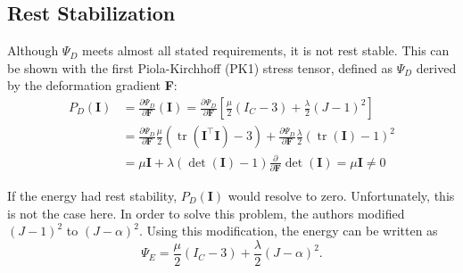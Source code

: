 
\subsection{Rest Stabilization}
Although $\Psi_{D}$ meets almost all stated requirements, it is not rest stable. This can be shown with the first Piola-Kirchhoff (PK1) stress tensor, defined as $\Psi_D$ derived by the deformation gradient \textbf{F}:
\begin{align*}
P_{D}(\mathbf{I}) &= \frac{\partial \Psi_{D}}{\partial \mathbf{F}} (\mathbf{I}) = \frac{\partial \Psi_{D}}{\partial \mathbf{F}} \left[ \frac{\mu}{2}\left(I_{C}-3\right) +\frac{\lambda}{2}(J-1)^{2} \right] \\
&= \frac{\partial \Psi_{D}}{\partial \mathbf{F}}  \frac{\mu}{2}\left(\operatorname{tr}(\mathbf{I}^\intercal \mathbf{I})-3\right) +\frac{\partial \Psi_{D}}{\partial \mathbf{F}} \frac{\lambda}{2}(\operatorname{tr}(\mathbf{I})-1)^{2} \\
&= \mu \mathbf{I} + \lambda (\operatorname{det}(\mathbf{I})-1)  \frac{\partial}{\partial \mathbf{F}} \operatorname{det}(\mathbf{I}) = \mu \mathbf{I} \neq 0
\end{align*}

If the energy had rest stability, $P_{D}(\mathbf{I})$ would resolve to zero. Unfortunately, this is not the case here. In order to solve this problem, the authors modified $(J-1)^{2}$ to $(J-\alpha)^{2}$. Using this modification, the energy can be written as
\[
\Psi_{E} = \frac{\mu}{2}\left(I_{C}-3\right) +\frac{\lambda}{2}(J-\alpha)^{2}.
\]

